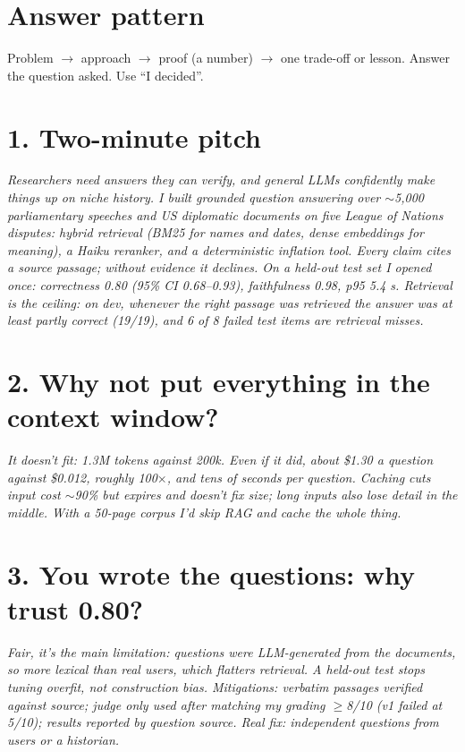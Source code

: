 \documentclass[10pt,a4paper]{article}
\newcommand{\ans}[1]{\par\smallskip\begingroup\itshape #1\par\endgroup}
\begin{document}
\section{Answer pattern}
Problem $\to$ approach $\to$ proof (a number) $\to$ one trade-off or lesson. Answer the question asked. Use ``I decided''.

\section{1. Two-minute pitch}
\ans{Researchers need answers they can verify, and general LLMs confidently make things up on niche history. I built
grounded question answering over $\sim$5,000 parliamentary speeches and US diplomatic documents on five League of Nations
disputes: hybrid retrieval (BM25 for names and dates, dense embeddings for meaning), a Haiku reranker, and a
deterministic inflation tool. Every claim cites a source passage; without evidence it declines. On a held-out test set I
opened once: correctness 0.80 (95\% CI 0.68--0.93), faithfulness 0.98, p95 5.4 s. Retrieval is the ceiling: on dev, whenever the
right passage was retrieved the answer was at least partly correct (19/19), and 6 of 8 failed test items are retrieval misses.}

\section{2. Why not put everything in the context window?}
\ans{It doesn't fit: 1.3M tokens against 200k. Even if it did, about \$1.30 a question against \$0.012, roughly 100$\times$,
and tens of seconds per question. Caching cuts input cost $\sim$90\% but expires and doesn't fix size; long inputs also lose
detail in the middle. With a 50-page corpus I'd skip RAG and cache the whole thing.}

\section{3. You wrote the questions: why trust 0.80?}
\ans{Fair, it's the main limitation: questions were LLM-generated from the documents, so more lexical than real users,
which flatters retrieval. A held-out test stops tuning overfit, not construction bias. Mitigations: verbatim passages
verified against source; judge only used after matching my grading $\geq$8/10 (v1 failed at 5/10); results reported by
question source. Real fix: independent questions from users or a historian.}
\end{document}
